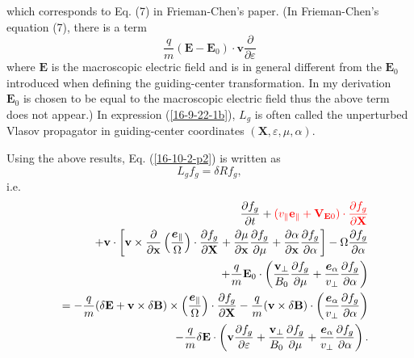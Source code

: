 \documentclass{llncs}
\newcommand{\tmcolor}[2]{{\color{#1}{#2}}}
\newcommand{\tmmathbf}[1]{\ensuremath{\boldsymbol{#1}}}
\begin{document}
which corresponds to Eq. (7) in Frieman-Chen's paper{\cite{frieman1982}}. (In
Frieman-Chen's equation (7), there is a term
\[ \frac{q}{m} (\mathbf{E}-\mathbf{E}_0) \cdot \mathbf{v}
   \frac{\partial}{\partial \varepsilon} \]
where $\mathbf{E}$ is the macroscopic electric field and is in general
different from the $\mathbf{E}_0$ introduced when defining the guiding-center
transformation. In my derivation \ $\mathbf{E}_0$ is chosen to be equal to the
macroscopic electric field thus the above term does not appear.) In expression
(\ref{16-9-22-1b}), $L_g$ is often called the unperturbed Vlasov propagator in
guiding-center coordinates $(\mathbf{X}, \varepsilon, \mu, \alpha)$.

Using the above results, Eq. (\ref{16-10-2-p2}) is written as
\begin{equation}
  \label{16-9-22-p1} L_g f_g = \delta R f_g,
\end{equation}
i.e.
\begin{eqnarray}
  &  & \frac{\partial f_g}{\partial t} + \tmcolor{red}{(v_{\parallel}
  \mathbf{e}_{\parallel} +\mathbf{V}_{\mathbf{E}0}) \cdot \frac{\partial
  f_g}{\partial \mathbf{X}}} \nonumber\\
  &  & +\mathbf{v} \cdot \left[ \mathbf{v} \times \frac{\partial}{\partial
  \mathbf{x}} \left( \frac{\tmmathbf{e}_{\parallel}}{\Omega} \right) \cdot
  \frac{\partial f_g}{\partial \mathbf{X}} + \frac{\partial \mu}{\partial
  \mathbf{x}}  \frac{\partial f_g}{\partial \mu} + \frac{\partial
  \alpha}{\partial \mathbf{x}}  \frac{\partial f_g}{\partial \alpha} \right] -
  \Omega \frac{\partial f_g}{\partial \alpha} \nonumber\\
  &  & + \frac{q}{m} \mathbf{E}_0 \cdot \left( \frac{\mathbf{v}_{\perp}}{B_0}
  \frac{\partial f_g}{\partial \mu} + \frac{\tmmathbf{e}_{\alpha}}{v_{\perp}}
  \frac{\partial f_g}{\partial \alpha} \right) \nonumber\\
  &  & = - \frac{q}{m} (\delta \mathbf{E}+\mathbf{v} \times \delta
  \mathbf{B}) \times \left( \frac{\tmmathbf{e}_{\parallel}}{\Omega}  \right)
  \cdot \frac{\partial f_g}{\partial \mathbf{X}} - \frac{q}{m} (\mathbf{v}
  \times \delta \mathbf{B}) \cdot \left(
  \frac{\tmmathbf{e}_{\alpha}}{v_{\perp}}  \frac{\partial f_g}{\partial
  \alpha} \right) \nonumber\\
  &  & - \frac{q}{m} \delta \mathbf{E} \cdot \left( \mathbf{v} \frac{\partial
  f_g}{\partial \varepsilon} + \frac{\mathbf{v}_{\perp}}{B_0}  \frac{\partial
  f_g}{\partial \mu} + \frac{\tmmathbf{e}_{\alpha}}{v_{\perp}}  \frac{\partial
  f_g}{\partial \alpha} \right) .  \label{18-12-16-1}
\end{eqnarray}
\end{document}
